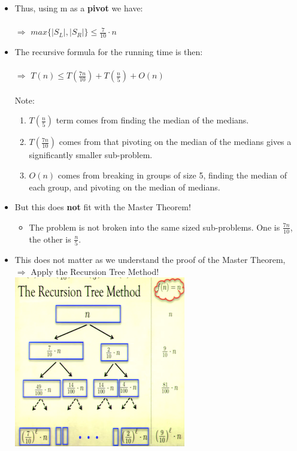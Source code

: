 \documentclass[12pt]{article}
\begin{document}
\begin{itemize}
\item Thus, using m as a \textbf{pivot} we have:\\
\\
$\Rightarrow$    {\large $max\{|S_L|, |S_R|\} \leq \frac{7}{10} \cdot n$}
\item The recursive formula for the running time is then:\\
\\
$\Rightarrow$    {\large $T(n) \leq T(\frac{7n}{10}) + T(\frac{n}{5}) + O(n)$}\\
\\
Note: 
\begin{enumerate}
\item {\large $T(\frac{n}{5})$} term comes from finding the median of the medians.
\item {\large $T(\frac{7n}{10})$} comes from that pivoting on the median of the medians gives a significantly smaller  sub-problem.
\item {\large $O(n)$} comes from breaking in groups of size 5, finding the median of each group, and pivoting on the median of medians.
\end{enumerate}
\item But this does \textbf{not} fit with the Master Theorem!
	\begin{itemize}
	\item The problem is not broken into the same sized sub-problems. One is {\large $\frac{7n}{10}$}, the other is {\large $\frac{n}{5}$}.
	\end{itemize}
\item This does not matter as we understand the proof of the Master Theorem,\\
$\Rightarrow$   Apply the Recursion Tree Method!\\
\includegraphics{lecture59}\\

\end{itemize}
\end{document}
